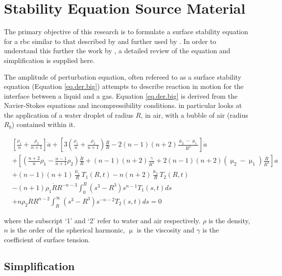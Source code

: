 \section{Stability Equation Source Material} \label{Sect.SE}
\noindent The primary objective of this research is to formulate a surface stability equation for a \ac{rbc} similar to that described by \citet{Prosperetti1974} and further used by \citet{Zeng2018}. In order to understand this further the work by \citet{Zeng2018}, a detailed review of the equation and simplification is supplied here. 

The amplitude of perturbation equation, often refereed to as a surface stability equation (Equation \ref{eq.der.big}) attempts to describe reaction in motion for the interface between a liquid and a gas. Equation \ref{eq.der.big} is derived from the Navier-Stokes equations and incompressibility conditions. \citet{Zeng2018} in particular looks at the application of a water droplet of radius $R$, in air, with a bubble of air (radius $R_b$) contained within it. 

\begin{equation} \label{eq.der.big}
\begin{split}
&\left[ \frac{\rho_1}{n} + \frac{\rho_2}{n+1} \right] \ddot{a} + \left[3 \left( \frac{\rho_1}{n} + \frac{\rho_2}{n+1} \right) \frac{\dot{R}}{R} - 2(n-1)(n+2) \frac{\upmu_2 - \upmu_1}{R^2} \right]\dot{a}  \\ & +\left[ \left(  \frac{n+2}{n}\rho_1 - \frac{n-1}{n+1}\rho_2 \right)\frac{\ddot{R}}{R} + (n-1)(n+2)\frac{\gamma}{R^3} + 2(n-1)(n+2)(\upmu_2 -\upmu_1)\frac{\dot{R}}{R^3}  \right] a  \\& + (n-1)(n+1)\frac{\upmu_1}{R} T_1(R,t) - n(n+2)\frac{\upmu_2}{R} T_2(R,t)  \\ & - (n+1)\rho_1\dot{R}R^{-n-3} \int_0^R (s^3-R^3)s^{n-1}T_1(s,t)ds \\ & + n\rho_2 \dot{R}R^{n-2} \int_{R}^{\infty} (s^3 - R^3)s^{-n-2} T_2(s,t) ds = 0 
\end{split}
\end{equation}

\noindent where the subscript `1' and `2' refer to water and air respectively. $\rho$ is the density, $n$ is the order of the spherical harmonic, $\upmu$ is the viscosity and $\gamma$ is the coefficient of surface tension.
\subsection{Simplification}

